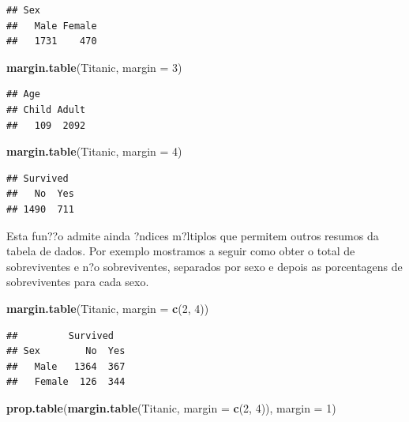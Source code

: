 \documentclass[]{book}
\newenvironment{Shaded}{\begin{snugshade}}{\end{snugshade}}
\newcommand{\DataTypeTok}[1]{\textcolor[rgb]{0.13,0.29,0.53}{#1}}
\newcommand{\DecValTok}[1]{\textcolor[rgb]{0.00,0.00,0.81}{#1}}
\newcommand{\KeywordTok}[1]{\textcolor[rgb]{0.13,0.29,0.53}{\textbf{#1}}}
\newcommand{\NormalTok}[1]{#1}
\begin{document}
\begin{verbatim}
## Sex
##   Male Female 
##   1731    470
\end{verbatim}

\begin{Shaded}
\begin{Highlighting}[]
\KeywordTok{margin.table}\NormalTok{(Titanic, }\DataTypeTok{margin =} \DecValTok{3}\NormalTok{)}
\end{Highlighting}
\end{Shaded}

\begin{verbatim}
## Age
## Child Adult 
##   109  2092
\end{verbatim}

\begin{Shaded}
\begin{Highlighting}[]
\KeywordTok{margin.table}\NormalTok{(Titanic, }\DataTypeTok{margin =} \DecValTok{4}\NormalTok{)}
\end{Highlighting}
\end{Shaded}

\begin{verbatim}
## Survived
##   No  Yes 
## 1490  711
\end{verbatim}

Esta fun??o admite ainda ?ndices m?ltiplos que permitem outros resumos da tabela de dados. Por exemplo mostramos a seguir como obter o total de sobreviventes e n?o sobreviventes, separados por sexo e depois as porcentagens de sobreviventes para cada sexo.

\begin{Shaded}
\begin{Highlighting}[]
\KeywordTok{margin.table}\NormalTok{(Titanic, }\DataTypeTok{margin =} \KeywordTok{c}\NormalTok{(}\DecValTok{2}\NormalTok{, }\DecValTok{4}\NormalTok{))}
\end{Highlighting}
\end{Shaded}

\begin{verbatim}
##         Survived
## Sex        No  Yes
##   Male   1364  367
##   Female  126  344
\end{verbatim}

\begin{Shaded}
\begin{Highlighting}[]
\KeywordTok{prop.table}\NormalTok{(}\KeywordTok{margin.table}\NormalTok{(Titanic, }\DataTypeTok{margin =} \KeywordTok{c}\NormalTok{(}\DecValTok{2}\NormalTok{, }\DecValTok{4}\NormalTok{)), }\DataTypeTok{margin =} \DecValTok{1}\NormalTok{)}
\end{Highlighting}
\end{Shaded}
\end{document}
